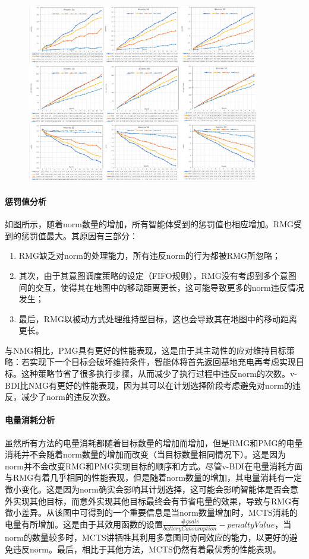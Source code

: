 \begin{figure}[htb]
\centering
\includegraphics[width=0.9\textwidth]{./figs/ltl_low_battery}
\label{fig:ltl_low}
\end{figure}

\paragraph{惩罚值分析}
如图所示，随着norm数量的增加，所有智能体受到的惩罚值也相应增加。RMG受到的惩罚值最大。其原因有三部分：
\begin{enumerate}
  \item RMG缺乏对norm的处理能力，所有违反norm的行为都被RMG所忽略；
  \item 其次，由于其意图调度策略的设定（FIFO规则），RMG没有考虑到多个意图间的交互，使得其在地图中的移动距离更长，这可能导致更多的norm违反情况发生；
  \item 最后，RMG以被动方式处理维持型目标，这也会导致其在地图中的移动距离更长。
\end{enumerate}
与NMG相比，PMG具有更好的性能表现，这是由于其主动性的应对维持目标策略：若实现下一个目标会破坏维持条件，智能体将首先返回基地充电再考虑实现目标。这种策略节省了很多执行步骤，从而减少了执行过程中违反norm的次数。v-BDI比NMG有更好的性能表现，因为其可以在计划选择阶段考虑避免对norm的违反，减少了norm的违反次数。
\paragraph{电量消耗分析}
虽然所有方法的电量消耗都随着目标数量的增加而增加，但是RMG和PMG的电量消耗并不会随着norm数量的增加而改变（当目标数量相同情况下）。这是因为norm并不会改变RMG和PMG实现目标的顺序和方式。尽管v-BDI在电量消耗方面与RMG有着几乎相同的性能表现，但是随着norm数量的增加，其电量消耗有一定微小变化。这是因为norm确实会影响其计划选择，这可能会影响智能体是否会意外实现其他目标，而意外实现其他目标最终会有节省电量的效果，导致与RMG有微小差异。从该图中可得到的一个重要信息是当norm数量增加时，MCTS消耗的电量有所增加。这是由于其效用函数的设置$\frac{\#goals}{batteryConsumption} - penaltyValue$，当norm的数量较多时，MCTS讲牺牲其利用多意图间协同效应的能力，以更好的避免违反norm。最后，相比于其他方法，MCTS仍然有着最优秀的性能表现。
